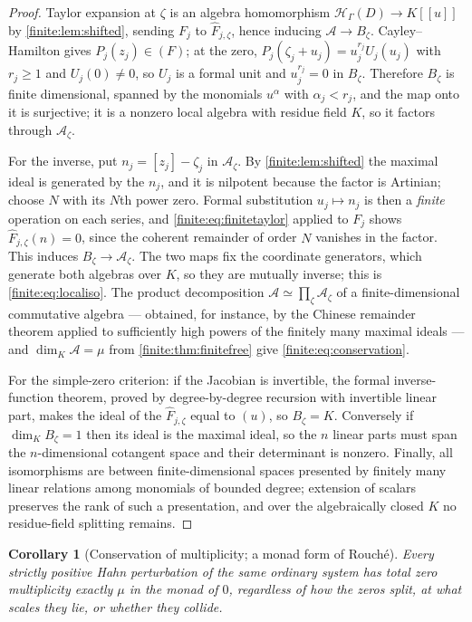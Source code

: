 \documentclass[11pt,letterpaper]{article}
\newtheorem{corollary}[theorem]{Corollary}
\theoremstyle{definition}
\theoremstyle{remark}
\newcommand{\HH}{\mathscr H}
\newcommand{\Alg}{\mathcal A}
\numberwithin{equation}{section}
\begin{document}
\begin{proof}
Taylor expansion at $\zeta$ is an algebra homomorphism $\HH_\Gamma(D)\to K[[u]]$ by \cref{finite:lem:shifted}, sending $F_j$ to $\widehat F_{j,\zeta}$, hence inducing $\Alg\to B_\zeta$. Cayley--Hamilton gives $P_j(z_j)\in(F)$; at the zero, $P_j(\zeta_j+u_j)=u_j^{r_j}U_j(u_j)$ with $r_j\geq1$ and $U_j(0)\neq0$, so $U_j$ is a formal unit and $u_j^{r_j}=0$ in $B_\zeta$. Therefore $B_\zeta$ is finite dimensional, spanned by the monomials $u^\alpha$ with $\alpha_j<r_j$, and the map onto it is surjective; it is a nonzero local algebra with residue field $K$, so it factors through $\Alg_\zeta$.

For the inverse, put $n_j=[z_j]-\zeta_j$ in $\Alg_\zeta$. By \cref{finite:lem:shifted} the maximal ideal is generated by the $n_j$, and it is nilpotent because the factor is Artinian; choose $N$ with its $N$th power zero. Formal substitution $u_j\mapsto n_j$ is then a \emph{finite} operation on each series, and \eqref{finite:eq:finitetaylor} applied to $F_j$ shows $\widehat F_{j,\zeta}(n)=0$, since the coherent remainder of order $N$ vanishes in the factor. This induces $B_\zeta\to\Alg_\zeta$. The two maps fix the coordinate generators, which generate both algebras over $K$, so they are mutually inverse; this is \eqref{finite:eq:localiso}. The product decomposition $\Alg\simeq\prod_\zeta\Alg_\zeta$ of a finite-dimensional commutative algebra --- obtained, for instance, by the Chinese remainder theorem applied to sufficiently high powers of the finitely many maximal ideals --- and $\dim_K\Alg=\mu$ from \cref{finite:thm:finitefree} give \eqref{finite:eq:conservation}.

For the simple-zero criterion: if the Jacobian is invertible, the formal inverse-function theorem, proved by degree-by-degree recursion with invertible linear part, makes the ideal of the $\widehat F_{j,\zeta}$ equal to $(u)$, so $B_\zeta=K$. Conversely if $\dim_KB_\zeta=1$ then its ideal is the maximal ideal, so the $n$ linear parts must span the $n$-dimensional cotangent space and their determinant is nonzero. Finally, all isomorphisms are between finite-dimensional spaces presented by finitely many linear relations among monomials of bounded degree; extension of scalars preserves the rank of such a presentation, and over the algebraically closed $K$ no residue-field splitting remains.
\end{proof}

\begin{corollary}[Conservation of multiplicity; a monad form of Rouch\'e]
\label{finite:cor:rouche}
Every strictly positive Hahn perturbation of the same ordinary system has total zero multiplicity exactly $\mu$ in the monad of $0$, regardless of how the zeros split, at what scales they lie, or whether they collide.
\end{corollary}
\end{document}

